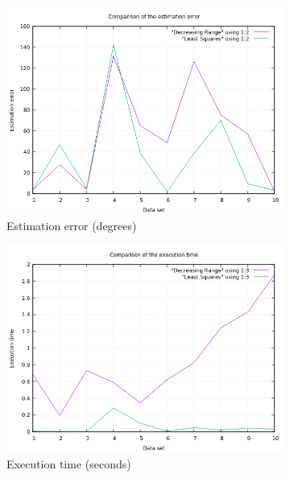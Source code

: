 \begin{figure}[!htb]
	\begin{subfigure}[b]{0.5\textwidth}
		\includegraphics[width=\linewidth]{images/results/comparisonErrorsDRLS.png}
		\caption{Estimation error (degrees)}
	\end{subfigure}
	\hfill
	\begin{subfigure}[b]{0.5\textwidth}
		\includegraphics[width=\linewidth]{images/results/comparisonTimeDRLS.png}
		\caption{Execution time (seconds)}
	\end{subfigure}
	\hfill
	\begin{subfigure}[b]{0.5\textwidth}

\end{subfigure}
\end{figure}
